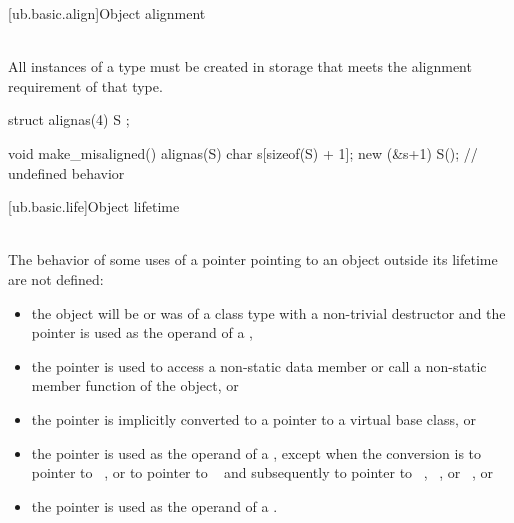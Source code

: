 [ub.basic.align]{Object alignment}

\pnum
{} \\
All instances of a type must be created in storage that meets the alignment
requirement of that type.

\pnum
\begin{example}
\begin{codeblock}
struct alignas(4) S {};

void make_misaligned()
{
    alignas(S) char s[sizeof(S) + 1];
    new (&s+1) S();  // undefined behavior
}
\end{codeblock}
\end{example}

[ub.basic.life]{Object lifetime}

\pnum
{} \\
The behavior of some uses of a pointer
pointing to an object outside its lifetime
are not defined:
\begin{itemize}
\item
  the object will be or was of a class type with a non-trivial destructor
  and the pointer is used as the operand of a ,
\item
  the pointer is used to access a non-static data member or call a
  non-static member function of the object, or
\item
  the pointer is implicitly converted to a pointer
  to a virtual base class, or
\item
  the pointer is used as the operand of a
  , except when the conversion
  is to pointer to \cv{}~, or to pointer to \cv{}~
  and subsequently to pointer to
  \cv{}~,
  \cv{}~, or
  \cv{}~, or
\item
  the pointer is used as the operand of a
  .
\end{itemize}


